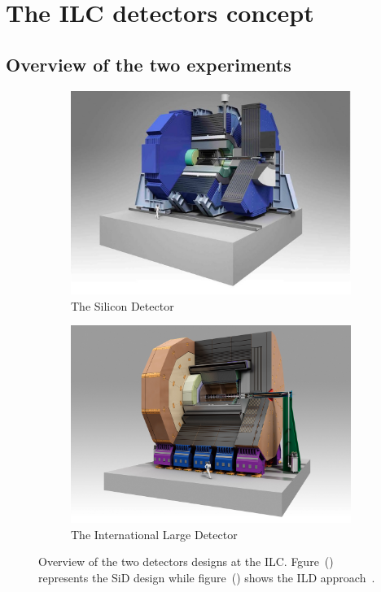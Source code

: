   \section{The ILC detectors concept}
  \label{sec:detectors}

    \subsection{Overview of the two experiments}
    
    \begin{figure}[!h]
      \centering
      \begin{subfigure}[t]{0.5\textwidth}
        \includegraphics[width = \textwidth]{Pictures/ILC/SiD.jpg}
        \caption{\label{fig:SiD} The Silicon Detector}
      \end{subfigure}
      \begin{subfigure}[t]{0.5\textwidth}
        \includegraphics[width = 1.03\textwidth]{Pictures/ILC/ILD.jpg}
        \caption{\label{fig:ILD} The International Large Detector}
      \end{subfigure}
    \caption{Overview of the two detectors designs at the ILC. Fgure~() represents the SiD design while figure~() shows the ILD approach~\cite{Behnke2010}.}
      \label{fig:Detectors}
    \end{figure}    

